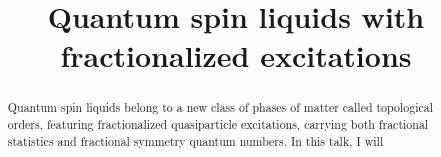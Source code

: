 \documentclass[12pt]{article}
\begin{document}
\title{Quantum spin liquids with fractionalized excitations}
\begin{abstract}
  Quantum spin liquids belong to a new class of phases of matter called topological orders, featuring fractionalized quasiparticle excitations, carrying both fractional statistics and fractional symmetry quantum numbers.
  In this talk, I will
\end{abstract}
\end{document}
